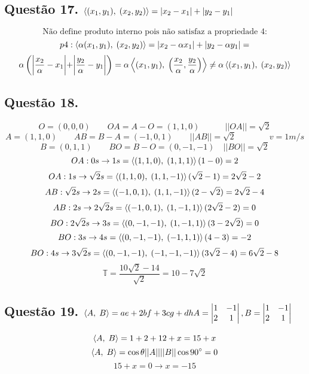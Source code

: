 \documentclass[12pt]{article}
\begin{document}
\subsection{Questão 17. $\left\langle(x_{1},y_{1}),\;(x_{2},y_{2})\right\rangle = |x_{2}-x_{1}|+|y_{2}-y_{1}|$}

\[\text{Não define produto interno pois não satisfaz a propriedade 4:}\]
\[p4: \left\langle\alpha(x_{1},y_{1}),\;(x_{2},y_{2})\right\rangle = |x_{2}-\alpha x_{1}|+|y_{2}-\alpha y_{1}| = \]
\[ \alpha \left( \biggr| \dfrac{x_{2}}{\alpha}-x_{1} \biggr| + \biggr| \dfrac{y_{2}}{\alpha}-y_{1} \biggr| \right) = \alpha \left\langle(x_{1},y_{1}),\;\left(\dfrac{x_{2}}{\alpha}, \dfrac{y_{2}}{\alpha}\right)\right\rangle \neq \alpha \left\langle(x_{1},y_{1}),\;(x_{2},y_{2})\right\rangle\]

\subsection{Questão 18.}

\[O = (0,0,0) \qquad OA = A-O = (1,1,0) \qquad\quad ||OA|| = \sqrt{2}\]
\[A = (1,1,0) \qquad AB = B-A = (-1,0,1) \qquad ||AB|| = \sqrt{2} \qquad\qquad v = 1m/s\]
\[B = (0,1,1) \qquad BO = B-O = (0,-1,-1) \quad ||BO|| = \sqrt{2}\]
\[OA: 0s \rightarrow 1s = \left\langle(1,1,0),\;(1,1,1)\right\rangle (1-0) = 2\]
\[OA: 1s \rightarrow \sqrt{2}s = \left\langle(1,1,0),\;(1,1,-1)\right\rangle (\sqrt{2}-1) = 2\sqrt{2}-2\]
\[AB: \sqrt{2}s \rightarrow 2s = \left\langle(-1,0,1),\;(1,1,-1)\right\rangle (2-\sqrt{2}) = 2\sqrt{2}-4\]
\[AB: 2s \rightarrow 2\sqrt{2}s = \left\langle(-1,0,1),\;(1,-1,1)\right\rangle (2\sqrt{2}-2) = 0\]
\[BO: 2\sqrt{2}s \rightarrow 3s = \left\langle(0,-1,-1),\;(1,-1,1)\right\rangle (3-2\sqrt{2}) = 0\]
\[BO: 3s \rightarrow 4s = \left\langle(0,-1,-1),\;(-1,1,1)\right\rangle (4-3) = -2\]
\[BO: 4s \rightarrow 3\sqrt{2}s = \left\langle(0,-1,-1),\;(-1,-1,-1)\right\rangle (3\sqrt{2}-4) = 6\sqrt{2}-8\]
\[\mathds{T} = \dfrac{10\sqrt{2}-14}{\sqrt{2}} = 10-7\sqrt{2}\]

\subsection{Questão 19. $\p{A}{B} = ae+2bf+3cg+dh \hfill A = \begin{vmatrix} 1&-1 \\ 2&1 \end{vmatrix}, B = \begin{vmatrix} 1&-1 \\ 2&1 \end{vmatrix}$}

\[\left\langle A,\;B\right\rangle = 1+2+12+x = 15+x\]
\[\p{A}{B} = \cos \theta ||A|| ||B|| \hfill \cos90^{\circ} = 0\]
\[15+x = 0 \longrightarrow x = -15\]
\end{document}
